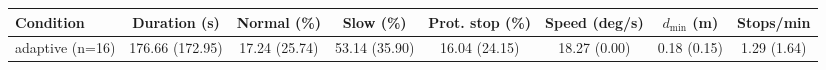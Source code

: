 \begin{tabular}{lccccccc}
\hline
Condition & Duration (s) & Normal (\%) & Slow (\%) & Prot. stop (\%) & Speed (deg/s) & $d_{\min}$ (m) & Stops/min \\
\hline
adaptive (n=16) & 176.66 (172.95) & 17.24 (25.74) & 53.14 (35.90) & 16.04 (24.15) & 18.27 (0.00) & 0.18 (0.15) & 1.29 (1.64) \\
\hline
\end{tabular}
